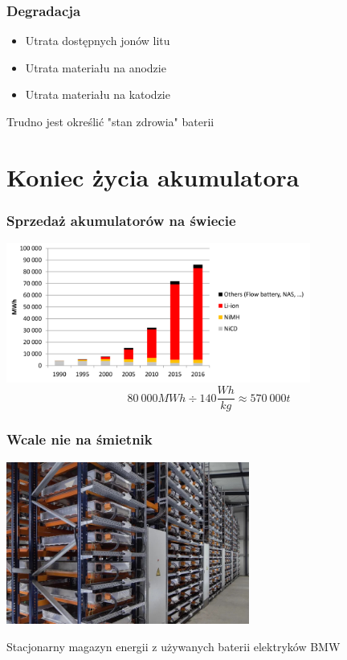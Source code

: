 \documentclass[
	11pt, %
]{beamer}
\begin{document}
\begin{frame}
	\frametitle{Degradacja}
	\centering
	\begin{itemize}
		\item Utrata dostępnych jonów litu
		\item Utrata materiału na anodzie
		\item Utrata materiału na katodzie
	\end{itemize} \cite{b17}

	\vspace{4em}
	Trudno jest określić "stan zdrowia" baterii \cite{s21}

\end{frame}

\section{Koniec życia akumulatora}

\begin{frame}
	\frametitle{Sprzedaż akumulatorów na świecie}
	\centering
	\includegraphics[width=10cm]{sales.png}\cite{p17}
	$$ 80\ 000 MWh \div 140 \frac{Wh}{kg} \approx 570\ 000 t$$\cite{m14}
\end{frame}

\begin{frame}
	\frametitle{Wcale nie na śmietnik}
	\centering
	\includegraphics[width=8cm]{bmw.jpg}

	Stacjonarny magazyn energii z używanych baterii elektryków BMW\cite{c17}
\end{frame}
\end{document}
